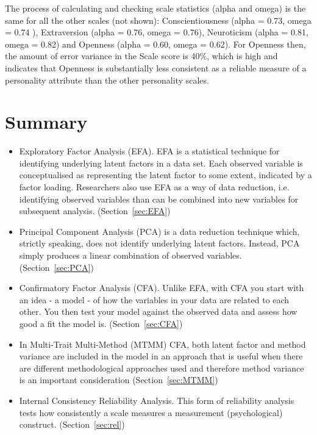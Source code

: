 The process of calculating and checking scale statistics (alpha and omega) is the same for all the other scales (not shown): Conscientiousness (alpha = 0.73, omega = 0.74 ), Extraversion (alpha = 0.76, omega = 0.76), Neuroticism (alpha = 0.81, omega = 0.82) and Openness (alpha = 0.60, omega = 0.62).  For Openness then, the amount of error variance in the Scale score is 40\%, which is high and indicates that Openness is substantially less consistent as a reliable measure of a personality attribute than the other personality scales. 


\section{Summary}

\begin{itemize} \itemsep -2pt
\item Exploratory Factor Analysis (EFA). EFA is a statistical technique for identifying underlying latent factors in a data set. Each observed variable is conceptualised as representing the latent factor to some extent, indicated by a factor loading. Researchers also use EFA as a way of data reduction, i.e. identifying observed variables than can be combined into new variables for subsequent analysis. (Section~\ref{sec:EFA})
\item Principal Component Analysis (PCA) is a data reduction technique which, strictly speaking, does not identify underlying latent factors. Instead, PCA simply produces a linear combination of observed variables. (Section~\ref{sec:PCA})
\item Confirmatory Factor Analysis (CFA). Unlike EFA, with CFA you start with an idea - a model - of how the variables in your data are related to each other. You then test your model against the observed data and assess how good a fit the model is.  (Section~\ref{sec:CFA})
\item In Multi-Trait Multi-Method (MTMM) CFA, both latent factor and method variance are included in the model in an approach that is useful when there are different methodological approaches used and therefore method variance is an important consideration (Section~\ref{sec:MTMM})
\item Internal Consistency Reliability Analysis. This form of reliability analysis tests how consistently a scale measures a measurement (psychological) construct. (Section~\ref{sec:rel})
\end{itemize}
